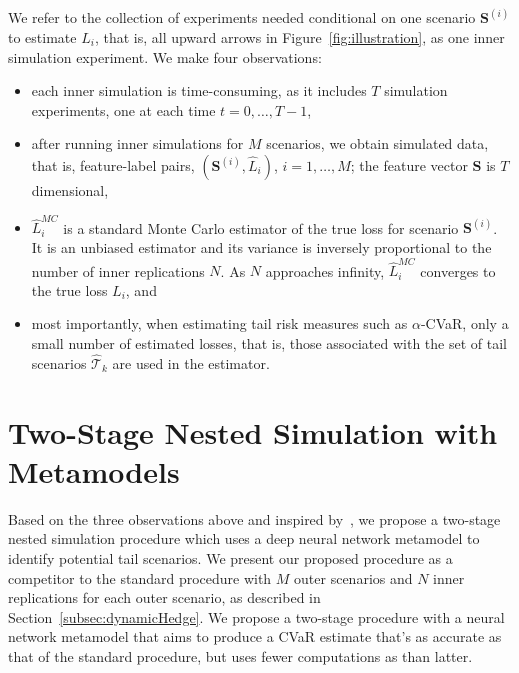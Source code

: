 \documentclass{article}
\newcommand{\tail}{\mathcal{T}}
\newcommand{\bS}{\bm{S}}
\newcommand{\Lhat}{\widehat{L}}
\begin{document}
We refer to the collection of experiments needed conditional on one scenario $\bS^{(i)}$ to estimate $L_i$, that is, all upward arrows in Figure~\ref{fig:illustration}, as one inner simulation experiment.
We make four observations:
\begin{itemize}
    \item   each inner simulation is time-consuming, as it includes $T$ simulation experiments, one at each time $t=0,\ldots,T-1$,
    \item   after running inner simulations for $M$ scenarios, we obtain simulated data, that is, feature-label pairs, $(\bS^{(i)}, \Lhat_i)$, $i=1,\ldots,M$; the feature vector $\bS$ is $T$ dimensional,
    \item   $\Lhat_i^{MC}$ is a standard Monte Carlo estimator of the true loss for scenario $\bS^{(i)}$. It is an unbiased estimator and its variance is inversely proportional to the number of inner replications $N$. 
    As $N$ approaches infinity, $\Lhat_i^{MC}$ converges to the true loss $L_i$, and
    \item   most importantly, when estimating tail risk measures such as $\alpha$-CVaR, only a small number of estimated losses, that is, those associated with the set of tail scenarios $\widehat{\tail}_{k}$ are used in the estimator.
\end{itemize}

\section{Two-Stage Nested Simulation with Metamodels} \label{sec:metamodel2Stage}

Based on the three observations above and inspired by~\cite{dang2020efficient}, we propose a two-stage nested simulation procedure which uses a deep neural network metamodel to identify potential tail scenarios.
We present our proposed procedure as a competitor to the standard procedure with $M$ outer scenarios and $N$ inner replications for each outer scenario, as described in Section~\ref{subsec:dynamicHedge}.
We propose a two-stage procedure with a neural network metamodel that aims to produce a CVaR estimate that's as accurate as that of the standard procedure, but uses fewer computations as than latter.

    
\end{document}
